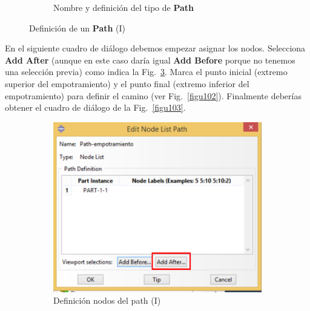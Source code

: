 \begin{enumerate}
\begin{figure}[H]
\begin{subfigure}{0.39\textwidth}
     \caption{Nombre y definición del tipo de \textbf{Path}}
     \label{figu100}
   \end{subfigure}%
   \caption{Definición de un \textbf{Path} (I)}
 \end{figure}

 En el siguiente cuadro de diálogo debemos empezar asignar los
 nodos. Selecciona \textbf{Add After} (aunque en este caso daría igual
 \textbf{Add Before} porque no tenemos una selección previa) como
 indica la Fig.~\ref{figu101}. Marca el punto inicial (extremo
 superior del empotramiento) y el punto final (extremo inferior del
 empotramiento) para definir el camino (ver
 Fig.~\ref{figu102}). Finalmente deberías obtener el cuadro de diálogo
 de la Fig.~\ref{figu103}.

 \begin{figure}[H]
   \centering
   \begin{subfigure}{0.30\textwidth}
     \includegraphics[width=\textwidth]{./body/images/imagen101.pdf}
     \caption{Definición nodos del path (I)}
     \label{figu101}
   \end{subfigure}%
   ~ %
   \begin{subfigure}{0.30\textwidth}

\end{subfigure}
\end{figure}
\end{enumerate}
